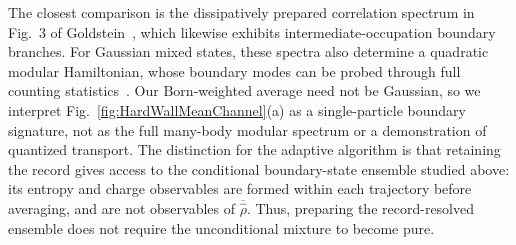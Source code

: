 \documentclass[aps,prb,twocolumn,superscriptaddress,longbibliography,floatfix]{revtex4-2}
\theoremstyle{plain}
\theoremstyle{definition}
\theoremstyle{remark}
\begin{document}
The closest comparison is the dissipatively prepared correlation spectrum
in Fig.~3 of Goldstein~\cite{Goldstein2019}, which likewise exhibits
intermediate-occupation boundary branches.  For Gaussian mixed states,
these spectra also determine a quadratic modular Hamiltonian, whose
boundary modes can be probed through full counting
statistics~\cite{MaoZhaiYang2025}.  Our Born-weighted average need not be
Gaussian, so we interpret Fig.~\ref{fig:HardWallMeanChannel}(a) as a
single-particle boundary signature, not as the full many-body modular
spectrum or a demonstration of quantized transport.  The distinction for
the adaptive algorithm is that retaining the record gives access to the
conditional boundary-state ensemble studied above: its entropy and charge
observables are formed within each trajectory before averaging, and are
not observables of $\overline{\hat\rho}$.  Thus, preparing the
record-resolved ensemble does not require the unconditional mixture to
become pure.

\clearpage
\endgroup

    {}
    {}
\end{document}
